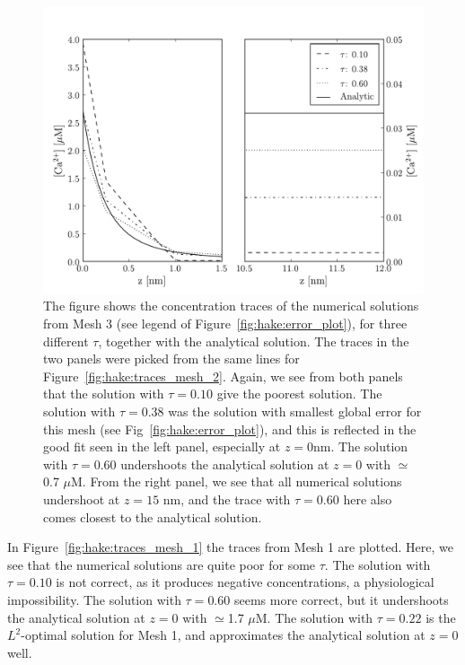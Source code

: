 \begin{figure}
  \label{fig:hake:traces_mesh_3}
  \center
    \includegraphics[width=\largefig]{chapters/hake/pdf/traces_mesh_3}
    \caption[Concentration traces 3]{The figure shows the
      concentration traces of the numerical solutions from Mesh 3 (see
      legend of Figure~\ref{fig:hake:error_plot}), for three different
      $\tau$, together with the analytical solution. The traces in the
      two panels were picked from the same lines for
      Figure~\ref{fig:hake:traces_mesh_2}. Again, we see from both
      panels that the solution with $\tau=0.10$ give the poorest
      solution. The solution with $\tau=0.38$ was the solution with
      smallest global error for this mesh (see
      Fig~\ref{fig:hake:error_plot}), and this is reflected in the
      good fit seen in the left panel, especially at $z=0$nm. The
      solution with $\tau=0.60$ undershoots the analytical solution at
      $z=0$ with $\simeq$0.7 $\mu$M. From the right panel, we see that
      all numerical solutions undershoot at $z=15$ nm, and the trace
      with $\tau=0.60$ here also comes closest to the analytical
      solution.}
\end{figure}

In Figure~\ref{fig:hake:traces_mesh_1} the traces from Mesh 1 are
plotted. Here, we see that the numerical solutions are quite poor for
some $\tau$. The solution with $\tau=0.10$ is not correct, as it
produces negative concentrations, a physiological impossibility. The
solution with $\tau=0.60$ seems more correct, but it undershoots the
analytical solution at $z=0$ with $\simeq$1.7 $\mu$M. The solution with
$\tau=0.22$ is the $L^2$-optimal solution for Mesh 1, and approximates
the analytical solution at $z=0$ well.

